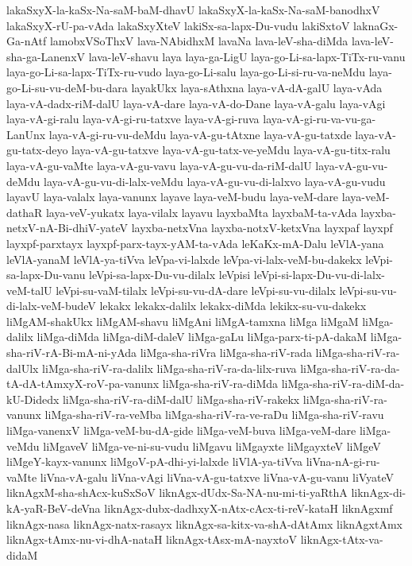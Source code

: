 {lakaSxyX-la-kaSx-Na-saM-baM-dhavU
lakaSxyX-la-kaSx-Na-saM-banodhxV
lakaSxyX-rU-pa-vAda
lakaSxyXteV
lakiSx-sa-lapx-Du-vudu
lakiSxtoV
laknaGx-Ga-nAtf
lamobxVSoThxV
lava-NAbidhxM
lavaNa
lava-leV-sha-diMda
lava-leV-sha-ga-LanenxV
lava-leV-shavu
laya
laya-ga-LigU
laya-go-Li-sa-lapx-TiTx-ru-vanu
laya-go-Li-sa-lapx-TiTx-ru-vudo
laya-go-Li-salu
laya-go-Li-si-ru-va-neMdu
laya-go-Li-su-vu-deM-bu-dara
layakUkx
laya-sAthxna
laya-vA-dA-galU
laya-vAda
laya-vA-dadx-riM-dalU
laya-vA-dare
laya-vA-do-Dane
laya-vA-galu
laya-vAgi
laya-vA-gi-ralu
laya-vA-gi-ru-tatxve
laya-vA-gi-ruva
laya-vA-gi-ru-va-vu-ga-LanUnx
laya-vA-gi-ru-vu-deMdu
laya-vA-gu-tAtxne
laya-vA-gu-tatxde
laya-vA-gu-tatx-deyo
laya-vA-gu-tatxve
laya-vA-gu-tatx-ve-yeMdu
laya-vA-gu-titx-ralu
laya-vA-gu-vaMte
laya-vA-gu-vavu
laya-vA-gu-vu-da-riM-dalU
laya-vA-gu-vu-deMdu
laya-vA-gu-vu-di-lalx-veMdu
laya-vA-gu-vu-di-lalxvo
laya-vA-gu-vudu
layavU
laya-valalx
laya-vanunx
layave
laya-veM-budu
laya-veM-dare
laya-veM-dathaR
laya-veV-yukatx
laya-vilalx
layavu
layxbaMta
layxbaM-ta-vAda
layxba-netxV-nA-Bi-dhiV-yateV
layxba-netxVna
layxba-notxV-ketxVna
layxpaf
layxpf
layxpf-parxtayx
layxpf-parx-tayx-yAM-ta-vAda
leKaKx-mA-Dalu
leVlA-yana
leVlA-yanaM
leVlA-ya-tiVva
leVpa-vi-lalxde
leVpa-vi-lalx-veM-bu-dakekx
leVpi-sa-lapx-Du-vanu
leVpi-sa-lapx-Du-vu-dilalx
leVpisi
leVpi-si-lapx-Du-vu-di-lalx-veM-talU
leVpi-su-vaM-tilalx
leVpi-su-vu-dA-dare
leVpi-su-vu-dilalx
leVpi-su-vu-di-lalx-veM-budeV
lekakx
lekakx-dalilx
lekakx-diMda
lekikx-su-vu-dakekx
liMgAM-shakUkx
liMgAM-shavu
liMgAni
liMgA-tamxna
liMga
liMgaM
liMga-dalilx
liMga-diMda
liMga-diM-daleV
liMga-gaLu
liMga-parx-ti-pA-dakaM
liMga-sha-riV-rA-Bi-mA-ni-yAda
liMga-sha-riVra
liMga-sha-riV-rada
liMga-sha-riV-ra-dalUlx
liMga-sha-riV-ra-dalilx
liMga-sha-riV-ra-da-lilx-ruva
liMga-sha-riV-ra-da-tA-dA-tAmxyX-roV-pa-vanunx
liMga-sha-riV-ra-diMda
liMga-sha-riV-ra-diM-da-kU-Didedx
liMga-sha-riV-ra-diM-dalU
liMga-sha-riV-rakekx
liMga-sha-riV-ra-vanunx
liMga-sha-riV-ra-veMba
liMga-sha-riV-ra-ve-raDu
liMga-sha-riV-ravu
liMga-vanenxV
liMga-veM-bu-dA-gide
liMga-veM-buva
liMga-veM-dare
liMga-veMdu
liMgaveV
liMga-ve-ni-su-vudu
liMgavu
liMgayxte
liMgayxteV
liMgeV
liMgeY-kayx-vanunx
liMgoV-pA-dhi-yi-lalxde
liVlA-ya-tiVva
liVna-nA-gi-ru-vaMte
liVna-vA-galu
liVna-vAgi
liVna-vA-gu-tatxve
liVna-vA-gu-vanu
liVyateV
liknAgxM-sha-shAcx-kuSxSoV
liknAgx-dUdx-Sa-NA-nu-mi-ti-yaRthA
liknAgx-di-kA-yaR-BeV-deVna
liknAgx-dubx-dadhxyX-nAtx-cAcx-ti-reV-kataH
liknAgxmf
liknAgx-nasa
liknAgx-natx-rasayx
liknAgx-sa-kitx-va-shA-dAtAmx
liknAgxtAmx
liknAgx-tAmx-nu-vi-dhA-nataH
liknAgx-tAsx-mA-nayxtoV
liknAgx-tAtx-va-didaM
}
